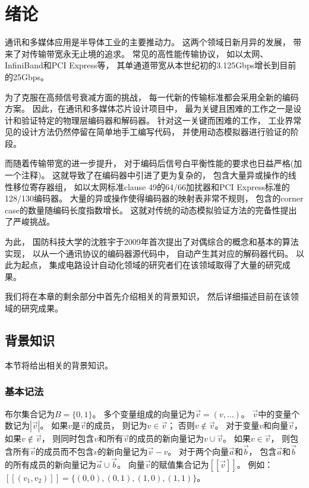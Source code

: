 \chapter{绪论}
\label{chap:1}

通讯和多媒体应用是半导体工业的主要推动力。
这两个领域日新月异的发展，
带来了对传输带宽永无止境的追求。
常见的高性能传输协议，
如以太网、InfiniBand和PCI Express等，
其单通道带宽从本世纪初的3.125Gbps增长到目前的25Gbps。

为了克服在高频信号衰减方面的挑战，
每一代新的传输标准都会采用全新的编码方案。
因此，在通讯和多媒体芯片设计项目中，
最为关键且困难的工作之一是设计和验证特定的物理层编码器和解码器。
针对这一关键而困难的工作，
工业界常见的设计方法仍然停留在简单地手工编写代码，
并使用动态模拟器进行验证的阶段。

而随着传输带宽的进一步提升，
对于编码后信号白平衡性能的要求也日益严格(加一个注释)。
这就导致了在编码器中引进了更为复杂的，
包含大量异或操作的线性移位寄存器组，
如以太网标准clause 49的64/66加扰器和PCI Express标准的128/130编码器。
大量的异或操作使得编码器的映射表非常不规则，
包含的corner case的数量随编码长度指数增长。
这就对传统的动态模拟验证方法的完备性提出了严峻挑战。

为此，
国防科技大学的沈胜宇于2009年首次提出了对偶综合的概念和基本的算法实现，
以从一个通讯协议的编码器源代码中，
自动产生其对应的解码器代码。
以此为起点，
集成电路设计自动化领域的研究者们在该领域取得了大量的研究成果。

我们将在本章的剩余部分中首先介绍相关的背景知识，
然后详细描述目前在该领域的研究成果。


\section{背景知识}
本节将给出相关的背景知识。

\subsection{基本记法}
布尔集合记为$B=\{0,1\}$。
多个变量组成的向量记为$\vec{v}=(v,\dots)$。
$\vec{v}$中的变量个数记为$|\vec{v}|$。
如果$v$是$\vec{v}$的成员，
则记为$v\in\vec{v}$；
否则$v\notin\vec{v}$。
对于变量$v$和向量$\vec{v}$，
如果$v\notin\vec{v}$，
则同时包含$v$和所有$\vec{v}$的成员的新向量记为$v\cup\vec{v}$。
如果$v\in \vec{v}$，
则包含所有$\vec{v}$的成员而不包含$v$的新向量记为$\vec{v}-v$。
对于两个向量$\vec{a}$和$\vec{b}$，
包含$\vec{a}$和$\vec{b}$的所有成员的新向量记为$\vec{a}\cup\vec{b}$。
向量$\vec{v}$的赋值集合记为$[\![\vec{v}]\!]$。
例如：
$[\![(v_1,v_2)]\!]=\{(0,0),(0,1),(1,0),(1,1)\}$。

